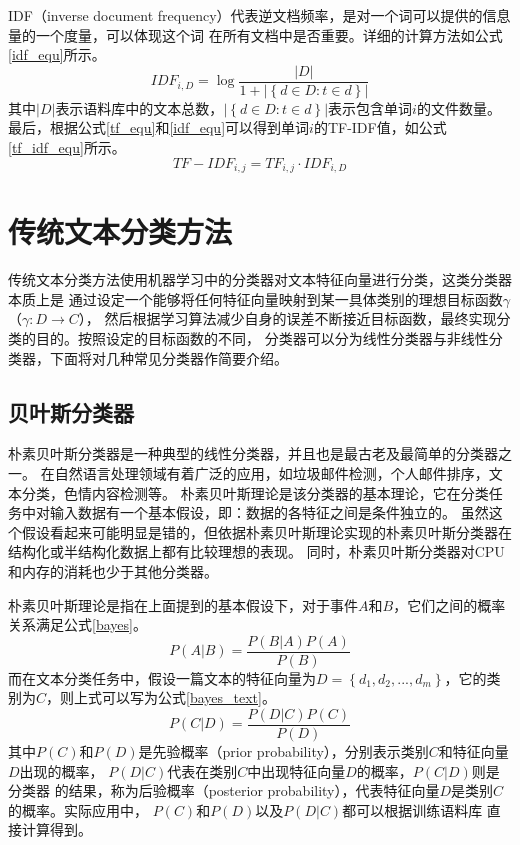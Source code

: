 IDF（inverse document frequency）代表逆文档频率，是对一个词可以提供的信息量的一个度量，可以体现这个词
在所有文档中是否重要。详细的计算方法如公式\ref{idf_equ}所示。
\begin{equation}
    IDF_{i,D}=\log \frac{\left | D \right |}{1+\left | \left \{ d\in D:t\in d \right \} \right |}
    \label{idf_equ}
\end{equation}
其中$\left | D \right |$表示语料库中的文本总数，$\left | \left \{ d\in D:t\in d \right \} \right |$表示包含单词$i$的文件数量。
最后，根据公式\ref{tf_equ}和\ref{idf_equ}可以得到单词$i$的TF-IDF值，如公式\ref{tf_idf_equ}所示。
\begin{equation}
    TF-IDF_{i,j}=TF_{i,j} \cdot IDF_{i,D}
    \label{tf_idf_equ}
\end{equation}

\section{传统文本分类方法}
传统文本分类方法使用机器学习中的分类器对文本特征向量进行分类，这类分类器本质上是
通过设定一个能够将任何特征向量映射到某一具体类别的理想目标函数$\gamma$（$\gamma :D\rightarrow C$），
然后根据学习算法减少自身的误差不断接近目标函数，最终实现分类的目的。按照设定的目标函数的不同，
分类器可以分为线性分类器与非线性分类器，下面将对几种常见分类器作简要介绍。
\subsection{贝叶斯分类器}
朴素贝叶斯分类器是一种典型的线性分类器，并且也是最古老及最简单的分类器之一。
在自然语言处理领域有着广泛的应用，如垃圾邮件检测，个人邮件排序，文本分类，色情内容检测等。
朴素贝叶斯理论是该分类器的基本理论，它在分类任务中对输入数据有一个基本假设，即：数据的各特征之间是条件独立的。
虽然这个假设看起来可能明显是错的，但依据朴素贝叶斯理论实现的朴素贝叶斯分类器在结构化或半结构化数据上都有比较理想的表现。
同时，朴素贝叶斯分类器对CPU和内存的消耗也少于其他分类器。

朴素贝叶斯理论是指在上面提到的基本假设下，对于事件$A$和$B$，它们之间的概率关系满足公式\ref{bayes}。
\begin{equation}
    P\left ( A | B\right )=\frac{P\left ( B | A\right )P\left ( A \right )}{P\left ( B \right )}
    \label{bayes}
\end{equation}
而在文本分类任务中，假设一篇文本的特征向量为$D=\left \{ d_1,d_2,...,d_m \right \}$，它的类别为$C$，则上式可以写为公式\ref{bayes_text}。
\begin{equation}
    P\left ( C | D\right )=\frac{P\left ( D | C\right )P\left ( C \right )}{P\left ( D \right )}
    \label{bayes_text}
\end{equation}
其中$P\left ( C \right )$和$P\left ( D \right )$是先验概率（prior probability），分别表示类别$C$和特征向量$D$出现的概率，
$P\left ( D | C\right )$代表在类别$C$中出现特征向量$D$的概率，$P\left ( C | D\right )$则是分类器
的结果，称为后验概率（posterior probability），代表特征向量$D$是类别$C$的概率。实际应用中，
$P\left ( C \right )$和$P\left ( D \right )$以及$P\left ( D | C\right )$都可以根据训练语料库
直接计算得到。

